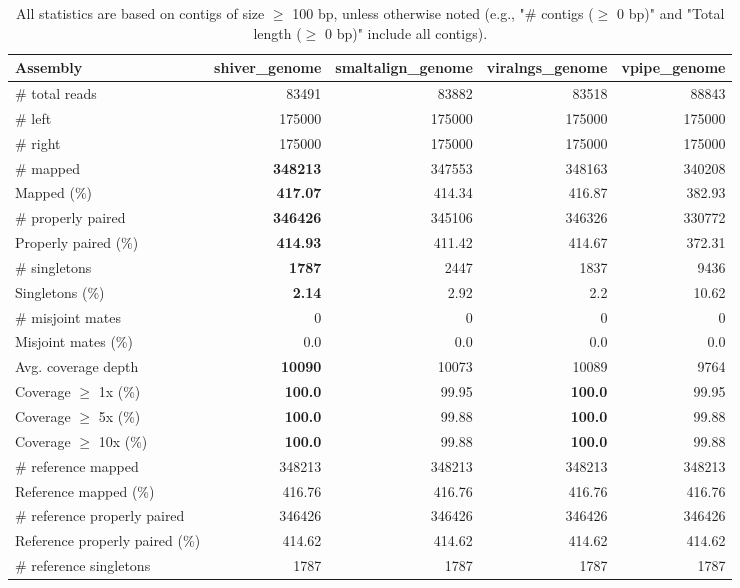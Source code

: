 \documentclass[12pt,a4paper]{article}
\begin{document}
\begin{table}[ht]
\begin{center}
\caption{All statistics are based on contigs of size $\geq$ 100 bp, unless otherwise noted (e.g., "\# contigs ($\geq$ 0 bp)" and "Total length ($\geq$ 0 bp)" include all contigs).}
\begin{tabular}{|l*{4}{|r}|}
\hline
Assembly & shiver\_genome & smaltalign\_genome & viralngs\_genome & vpipe\_genome \\ \hline
\# total reads & 83491 & 83882 & 83518 & 88843 \\ \hline
\# left & 175000 & 175000 & 175000 & 175000 \\ \hline
\# right & 175000 & 175000 & 175000 & 175000 \\ \hline
\# mapped & {\bf 348213} & 347553 & 348163 & 340208 \\ \hline
Mapped (\%) & {\bf 417.07} & 414.34 & 416.87 & 382.93 \\ \hline
\# properly paired & {\bf 346426} & 345106 & 346326 & 330772 \\ \hline
Properly paired (\%) & {\bf 414.93} & 411.42 & 414.67 & 372.31 \\ \hline
\# singletons & {\bf 1787} & 2447 & 1837 & 9436 \\ \hline
Singletons (\%) & {\bf 2.14} & 2.92 & 2.2 & 10.62 \\ \hline
\# misjoint mates & 0 & 0 & 0 & 0 \\ \hline
Misjoint mates (\%) & 0.0 & 0.0 & 0.0 & 0.0 \\ \hline
Avg. coverage depth & {\bf 10090} & 10073 & 10089 & 9764 \\ \hline
Coverage $\geq$ 1x (\%) & {\bf 100.0} & 99.95 & {\bf 100.0} & 99.95 \\ \hline
Coverage $\geq$ 5x (\%) & {\bf 100.0} & 99.88 & {\bf 100.0} & 99.88 \\ \hline
Coverage $\geq$ 10x (\%) & {\bf 100.0} & 99.88 & {\bf 100.0} & 99.88 \\ \hline
\# reference mapped & 348213 & 348213 & 348213 & 348213 \\ \hline
Reference mapped (\%) & 416.76 & 416.76 & 416.76 & 416.76 \\ \hline
\# reference properly paired & 346426 & 346426 & 346426 & 346426 \\ \hline
Reference properly paired (\%) & 414.62 & 414.62 & 414.62 & 414.62 \\ \hline
\# reference singletons & 1787 & 1787 & 1787 & 1787 \\ \hline

\end{tabular}
\end{center}
\end{table}
\end{document}
